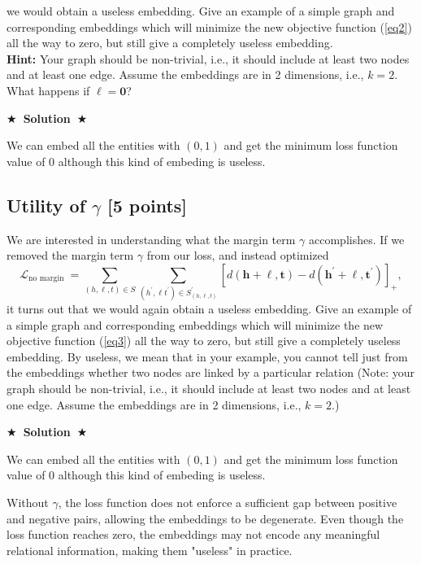 \documentclass[11pt]{article}
\numberwithin{figure}{section}
\newcommand{\Solution}[1]{{\medskip \color{red} \bf $\bigstar$~\sf \textbf{Solution}~$\bigstar$ \sf #1 } \bigskip}
\begin{document}
we would obtain a useless embedding. Give an example of a simple graph and corresponding embeddings which will minimize the new objective function (\ref{eq2}) all the way to zero, but still give a completely useless embedding.\\
\textbf{Hint:} Your graph should be non-trivial, i.e., it should include at least two nodes and at least one edge. Assume the embeddings are in 2 dimensions, i.e., $k = 2$.
What happens if $\boldsymbol{\ell} = \textbf{0}$?

\Solution{}

We can embed all the entities with $\left(0,1\right)$ and get the minimum loss function value of $0$ although this kind of embeding is useless.

\subsection{Utility of $\gamma$  [5 points]}
We are interested in understanding what the margin term $\gamma$ accomplishes. If we removed the margin term $\gamma$ from our loss, and instead optimized
\begin{equation}\label{eq3}
\mathcal{L}_{\text {no margin }}=\sum_{(h, \ell, t) \in S} \sum_{\left(h^{\prime}, \ell t^{\prime}\right) \in S_{(h, \ell, t)}^{\prime}}\left[d(\mathbf{h}+\boldsymbol{\ell}, \mathbf{t})-d\left(\mathbf{h}^{\prime}+\boldsymbol{\ell}, \mathbf{t}^{\prime}\right)\right]_{+},
\end{equation}
it turns out that we would again obtain a useless embedding. Give an example of a simple graph and corresponding embeddings which will minimize the new objective function (\ref{eq3}) all the way to zero, but still give a completely useless embedding. By useless, we mean that in your example, you cannot tell just from the embeddings whether two nodes are linked by a particular relation (Note: your graph should be non-trivial, i.e., it should include at least two nodes and at least one edge. Assume the embeddings are in 2 dimensions, i.e., $k=2$.)

\Solution{}

We can embed all the entities with $\left(0,1\right)$ and get the minimum loss function value of $0$ although this kind of embeding is useless.

Without $\gamma$, the loss function does not enforce a sufficient gap between positive and negative pairs, allowing the embeddings to be degenerate. Even though the loss function reaches zero, the embeddings may not encode any meaningful relational information, making them "useless" in practice.
\end{document}
